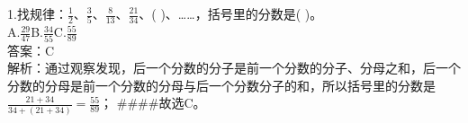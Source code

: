 \documentclass [UTF8]{ctexart}
\begin{document}
1.找规律：\( \frac{1}{2}\)、\( \frac{3}{5}\)、\( \frac{8}{13}\)、\( \frac{21}{34}\)、(   )、……，括号里的分数是(   )。\\
 A.\( \frac{29}{47}\)\quad\quad B.\( \frac{34}{55}\)\quad\quad C.\( \frac{55}{89}\)\\
答案：C\\
解析：通过观察发现，后一个分数的分子是前一个分数的分子、分母之和，后一个分数的分母是前一个分数的分母与后一个分数分子的和，所以括号里的分数是\( \frac{21+34}{34+(21+34)}=\frac{55}{89}\)； \#\#\#\#故选C。\\
\end{document}
